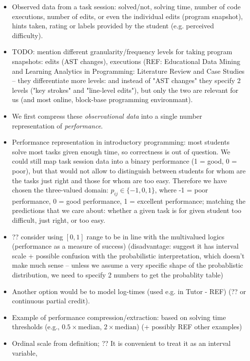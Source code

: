 \begin{itemize}
\item Observed data from a task session:
  solved/not, solving time, number of code executions, number of edits,
  or even the individual edits (program snapshot), hints taken,
  rating or labels provided by the student (e.g. perceived difficulty).
\item TODO: mention different granularity/frequency levels for taking program
  snapshots: edits (AST changes), executions
  (REF: Educational Data Mining and Learning Analytics in Programming:
  Literature Review and Case Studies -- they differentiate more levels:
  and instead of "AST changes" they specify 2 levels ("key strokes" and
  "line-level edits"), but only the two are relevant for us (and most online,
  block-base programming environmant).
\item We first compress these \emph{observational data} into a
  single number representation of \emph{performance}.
\item Performance representation in introductory programming:
  most students solve most tasks given enough time, so correctness is out of
  question. We could still map task session data into a binary performance (1
  = good, 0 = poor), but that would not allow to distinguish between students
  for whom are the tasks just right and those for whom are too easy.
  Therefore we have chosen the three-valued domain:
  $p_{ij} \in \{-1, 0, 1\}$, where -1 = poor performance, 0 = good performance,
  1 = excellent performance; matching the predictions that we care about:
  whether a given task is for given student too difficult, just right, or too easy.
\item ?? consider using $[0, 1]$ range to be in line with the multivalued logics
  (performance as a measure of success) (disadvantage: suggest it has interval
  scale + possible confusion with the probabilistic interpretation, which
  doesn't make much sense -- unless we assume a very specific shape of the
  probablistic distribution, we need to specify 2 numbers to get the probablity
  table)
\item Another option would be to model log-times (used e.g. in Tutor - REF)
  (?? or continuous partial credit).
\item Example of performance compression/extraction:
  based on solving time thresholds
  (e.g., $0.5 \times \text{median}$, $2 \times \text{median}$)
  (+ possibly REF other examples)
\item Ordinal scale from definition;
  ??  It is convenient to treat it as an interval variable,

\end{itemize}
